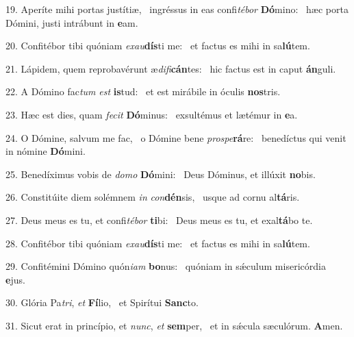 19. Aperíte mihi portas justítiæ, \dag\  ingréssus in eas confi\textit{té}\textit{bor} \textbf{Dó}mino: \ast\  hæc porta Dómini, justi intrábunt in \textbf{e}am.\

20. Confitébor tibi quóniam \textit{ex}\textit{au}\textbf{dís}ti me: \ast\  et factus es mihi in sa\textbf{lú}tem.\

21. Lápidem, quem reprobavérunt æ\textit{di}\textit{fi}\textbf{cán}tes: \ast\  hic factus est in caput \textbf{án}guli.\

22. A Dómino fac\textit{tum} \textit{est} \textbf{is}tud: \ast\  et est mirábile in óculis \textbf{nos}tris.\

23. Hæc est dies, quam \textit{fe}\textit{cit} \textbf{Dó}minus: \ast\  exsultémus et lætémur in \textbf{e}a.\

24. O Dómine, salvum me fac, \dag\  o Dómine bene \textit{pro}\textit{spe}\textbf{rá}re: \ast\  benedíctus qui venit in nómine \textbf{Dó}mini.\

25. Benedíximus vobis de \textit{do}\textit{mo} \textbf{Dó}mini: \ast\  Deus Dóminus, et illúxit \textbf{no}bis.\

26. Constitúite diem solémnem \textit{in} \textit{con}\textbf{dén}sis, \ast\  usque ad cornu al\textbf{tá}ris.\

27. Deus meus es tu, et confi\textit{té}\textit{bor} \textbf{ti}bi: \ast\  Deus meus es tu, et exal\textbf{tá}bo te.\

28. Confitébor tibi quóniam \textit{ex}\textit{au}\textbf{dís}ti me: \ast\  et factus es mihi in sa\textbf{lú}tem.\

29. Confitémini Dómino quón\textit{i}\textit{am} \textbf{bo}nus: \ast\  quóniam in sǽculum misericórdia \textbf{e}jus.\

30. Glória Pa\textit{tri}, \textit{et} \textbf{Fí}lio, \ast\  et Spirítui \textbf{Sanc}to.\

31. Sicut erat in princípio, et \textit{nunc}, \textit{et} \textbf{sem}per, \ast\  et in sǽcula sæculórum. \textbf{A}men.\

